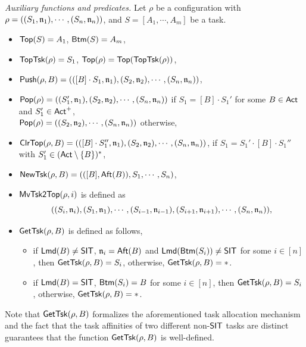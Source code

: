 \emph{Auxiliary functions and predicates.} 
Let $\rho$ be a configuration with $\rho = ((S_1,\mathfrak{n}_1),\cdots, (S_n,\mathfrak{n}_n))$, and $S=[A_1, \cdots, A_m]$ be a task. 
\begin{itemize}
	\item $\mathsf{Top}(S) = A_1$, $\mathsf{Btm}(S) = A_m$,
	\item $\mathsf{TopTsk}(\rho) = S_1$, $\mathsf{Top}(\rho) = \mathsf{Top}(\mathsf{TopTsk}(\rho))$, 
	\item $\mathsf{Push}(\rho, B) = (([B]\cdot S_1,\mathfrak{n}_1),(S_2,\mathfrak{n}_2),\cdots,(S_n,\mathfrak{n}_n))$,
	\item $\mathsf{Pop}(\rho) = ((S_1',\mathfrak{n}_1),(S_2,\mathfrak{n}_2), \cdots, (S_n,\mathfrak{n}_n))$ if $S_1=[B]\cdot S_1'$ for some $B\in{\sf Act}$ and $S_1'\in{\sf Act}^+$,\\ $\mathsf{Pop}(\rho) = ((S_2,\mathfrak{n}_2),\cdots,(S_n,\mathfrak{n}_n))$ otherwise,
	\item $\mathsf{ClrTop}(\rho, B) = (([B]\cdot S_1'',\mathfrak{n}_1), (S_2,\mathfrak{n}_2), \cdots, (S_n,\mathfrak{n}_n))$, if $S_1=S_1'\cdot[B]\cdot S_1''$ with $S_1'\in ({\sf Act}\setminus\{B\})^*$,
	\item $\mathsf{NewTsk}(\rho, B) = (([B],{\sf Aft}(B)), S_1, \cdots, S_n)$,
	\item $\mathsf{MvTsk2Top}(\rho, i)$ is defined as 
	$$((S_i,\mathfrak{n}_i), (S_1,\mathfrak{n}_1), \cdots, (S_{i-1},\mathfrak{n}_{i-1}), (S_{i+1},\mathfrak{n}_{i+1}), \cdots, (S_n,\mathfrak{n}_n)),$$
    \item $\mathsf{GetTsk}(\rho, B)$ is defined as follows,
     \begin{itemize}
     \item if ${\sf Lmd}(B)\neq{\sf SIT}$, $\mathfrak{n}_i={\sf Aft}(B)$ and ${\sf Lmd}(\mathsf{Btm}(S_i)) \neq {\sf SIT}$ for some $i \in [n]$,  then $\mathsf{GetTsk}(\rho, B) = S_i$, otherwise, $\mathsf{GetTsk}(\rho, B) = *$.
    \item if ${\sf Lmd}(B) = {\sf SIT}$, $\mathsf{Btm}(S_i)=B$ for some $i \in [n]$, then $\mathsf{GetTsk}(\rho, B) = S_i$, otherwise, $\mathsf{GetTsk}(\rho, B) = *$.
    \end{itemize}
\end{itemize}
Note that $\mathsf{GetTsk}(\rho, B)$ formalizes the aforementioned task allocation mechanism and the fact that the task affinities of two different non-$\mathsf{SIT}$ tasks are distinct guarantees that the function $\mathsf{GetTsk}(\rho, B)$ is well-defined. 

